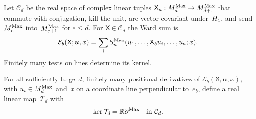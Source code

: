 Let $\mathcal C_d$ be the real space of complex linear tuples $\mathsf X_a:M_{d}^{\mathrm{Max}}\to M_{d+1}^{\mathrm{Max}}$ that commute with conjugation, kill the unit, are vector-covariant under~$H_4$, and send $M_{e}^{\mathrm{Max}}$ into~$M_{e+1}^{\mathrm{Max}}$ for $e\le d$. For $\mathsf X\in\mathcal C_d$ the Ward sum is
\begin{equation*}
\mathcal E_b(\mathsf X;\boldsymbol u,x)=\sum_i S_n^{\rm Max}(u_1,\ldots,\mathsf X_bu_i,\ldots,u_n;x).
\end{equation*}
Finitely many tests on lines determine its kernel.
\begin{lemma}\label{lem:G1-vector}
For all sufficiently large~$d$, finitely many positional derivatives of $\mathcal E_b(\mathsf X;\boldsymbol u,x)$, with $u_i\in M_{d}^{\mathrm{Max}}$ and~$x$ on a coordinate line perpendicular to~$e_b$, define a real linear map~$\mathcal T_d$ with
\begin{equation}\label{eq:G-free-tests}
\ker\mathcal T_d=\mathbb{R}\partial^{\rm Max}\quad\text{in }\mathcal C_d.
\end{equation}
\end{lemma}

